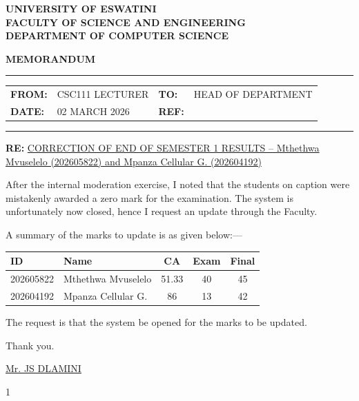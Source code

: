 \documentclass[a4paper,12pt]{article}
\begin{document}
\begin{center}
    \textbf{UNIVERSITY OF ESWATINI}\\[2pt]
    \textbf{FACULTY OF SCIENCE AND ENGINEERING} \\[2pt]
    \textbf{DEPARTMENT OF COMPUTER SCIENCE}
\end{center}

\vspace{0.5cm}

\begin{center}
    \textbf{MEMORANDUM}
\end{center}

\vspace{0.2cm}
\hrule
\vspace{0.2cm}

\noindent
\begin{tabular}{@{}p{}@{}p{}@{}p{}@{}p{}@{}}
    \textbf{FROM:} & CSC111 LECTURER & \textbf{TO:} & HEAD OF DEPARTMENT \\
    \textbf{DATE:} & 02 MARCH 2026   & \textbf{REF:} & \\
\end{tabular}

\vspace{0.2cm}
\hrule
\vspace{0.2cm}

\noindent
\textbf{RE:} \underline{CORRECTION OF END OF SEMESTER 1 RESULTS -- Mthethwa Mvuselelo (202605822) and Mpanza Cellular G. (202604192)}

\vspace{0.5cm}

\noindent
After the internal moderation exercise, I noted that the students on caption were mistakenly awarded a zero mark for the examination. The system is unfortunately now closed, hence I request an update through the Faculty.

\vspace{0.3cm}
\noindent
A summary of the marks to update is as given below:—

\vspace{0.3cm}

\begin{center}
    \begin{tabular}{@{}l l c c c@{}}
        \toprule
        \textbf{ID} & \textbf{Name} & \textbf{CA} & \textbf{Exam} & \textbf{Final} \\
        \midrule
        202605822 & Mthethwa Mvuselelo & 51.33 & 40 & 45 \\
        202604192 & Mpanza Cellular G. & 86    & 13 & 42 \\
        \bottomrule
    \end{tabular}
\end{center}

\vspace{0.5cm}
\noindent
The request is that the system be opened for the marks to be updated.

\vspace{1cm}
\noindent
Thank you.

\vspace{1.5cm}
\noindent
\underline{Mr. JS DLAMINI}

\vfill
\noindent
\hfill 1
\end{document}
